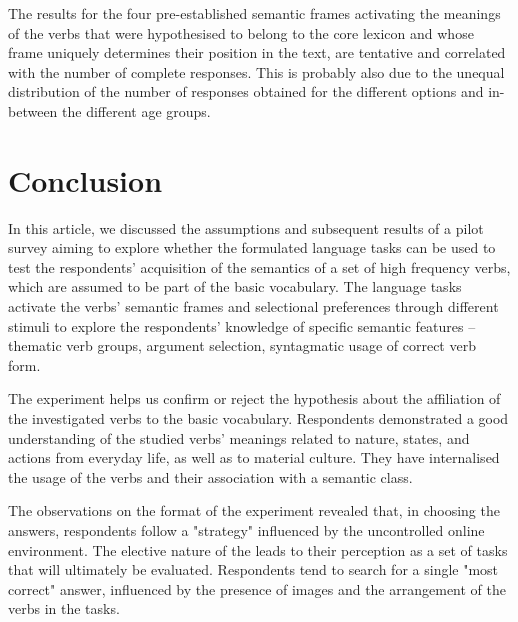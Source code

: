 \documentclass[output=paper,colorlinks,citecolor=brown]{langscibook}
\begin{document}
The results for the four pre-established semantic frames activating the meanings of the verbs that were hypothesised to belong to the core lexicon and whose frame uniquely determines their position in the text, are tentative and correlated with the number of complete responses. This is probably also due to the unequal distribution of the number of responses obtained for the different options and in-between the different age groups.


\section{Conclusion}\label{sec:5}

In this article, we discussed the assumptions and subsequent results of a pilot survey aiming to explore whether the formulated language tasks can be used to test the respondents' acquisition of the semantics of a set of high frequency verbs, which are assumed to be part of the basic vocabulary. The language tasks activate the verbs’ semantic frames and selectional preferences through different stimuli to explore the respondents' knowledge of specific semantic features -- thematic verb groups, argument selection, syntagmatic usage of correct verb form.


The experiment helps us confirm or reject the hypothesis about the affiliation of the investigated verbs to the basic vocabulary. Respondents demonstrated a good understanding of the studied verbs' meanings related to nature, states, and actions from everyday life, as well as to material culture. They have internalised the usage of the verbs and their association with a semantic class.

The observations on the format of the experiment revealed that, in choosing the answers, respondents follow a "strategy" influenced by the uncontrolled online environment. The elective nature of the  leads to their perception as a set of tasks that will ultimately be evaluated. Respondents tend to search for a single "most correct" answer, influenced by the presence of images and the arrangement of the verbs in the tasks.
\end{document}
